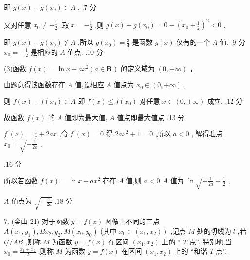 \documentclass[10pt]{article}
\begin{document}
即 \(g\left( x\right)  - g\left( {x}_{0}\right)  \in  A\) , .7 分

又对任意 \({x}_{0} \neq   - \frac{1}{2}\) ,取 \(x =  - \frac{1}{2}\) ,则 \(g\left( x\right)  - g\left( {x}_{0}\right)  = 0 - {\left( {x}_{0} + \frac{1}{2}\right) }^{2} < 0\) ,

即 \(g\left( x\right)  - g\left( {x}_{0}\right)  \notin  A\) ,所以 \(g\left( {x}_{0}\right)  = \frac{3}{4}\) 是函数 \(g\left( x\right)\) 仅有的一个 \(A\) 值. .9 分 \({x}_{0} =  - \frac{1}{2}\) 是相应的 \(A\) 值点. .10 分

(3)函数 \(f\left( x\right)  = \ln x + a{x}^{2}\left( {a \in  \mathbf{R}}\right)\) 的定义域为 \(\left( {0, + \infty }\right)\) ，

由题意得该函数存在 \(A\) 值,设相应 \(A\) 值点为 \({x}_{0} \in  \left( {0, + \infty }\right)\) ,

则 \(f\left( x\right)  - f\left( {x}_{0}\right)  \in  A\) 即 \(f\left( x\right)  \leq  f\left( {x}_{0}\right)\) 对任意 \(x \in  \left( {0, + \infty }\right)\) 成立, .12 分

故函数 \(f\left( x\right)\) 的 \(A\) 值即为最大值, \(A\) 值点即最大值点 .13 分

\({f}^{\prime }\left( x\right)  = \frac{1}{x} + {2ax}\) ,令 \({f}^{\prime }\left( x\right)  = 0\) 得 \({2a}{x}^{2} + 1 = 0\) ,所以 \(a < 0\) , 解得驻点 \({x}_{0} = \sqrt{-\frac{1}{2a}}\) ,

\begin{center}
\end{center}

.16 分

所以若函数 \(f\left( x\right)  = \ln x + a{x}^{2}\) 存在 \(A\) 值,则 \(a < 0,A\) 值为 \(\ln \sqrt{-\frac{1}{2a}} - \frac{1}{2}\) ,

\(A\) 值点为 \(\sqrt{-\frac{1}{2a}}\) .18 分

7. (金山 21) 对于函数 \(y = f\left( x\right)\) 图像上不同的三点 \(A\left( {{x}_{1},{y}_{1}}\right) ,B{x}_{2},{y}_{2},M\left( {{x}_{0},{y}_{0}}\right)\) (其中 \(\left. {{x}_{0} \in  \left( {{x}_{1},{x}_{2}}\right) }\right)\) ,记点 \(M\) 处的切线为 \(l\) ,若 \(l//{AB}\) ,则称 \(M\) 为函数 \(y = f\left( x\right)\) 在区间 \(\left( {{x}_{1},{x}_{2}}\right)\) 上的 “ \(T\) 点”. 特别地,当 \({x}_{0} = \frac{{x}_{1} + {x}_{2}}{2}\) ,则称 \(M\) 为函数 \(y = f\left( x\right)\) 在区间 \(\left( {{x}_{1},{x}_{2}}\right)\) 上的 “和谐 \(T\) 点”.
\end{document}
